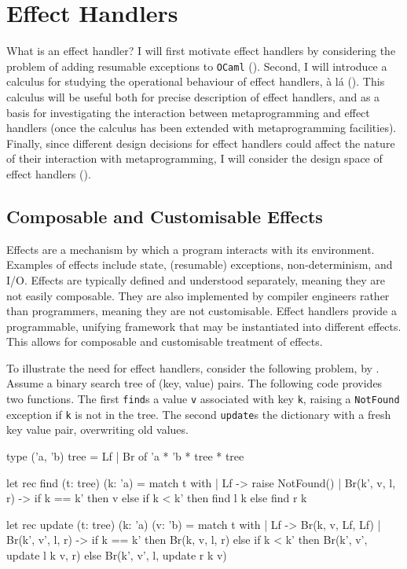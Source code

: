 \section{Effect Handlers}\label{section:effects-technical}
What is an effect handler? I will first motivate effect handlers by considering the problem of adding resumable exceptions to \texttt{OCaml} (). Second, I will introduce a calculus for studying the operational behaviour of effect handlers, à lá \citet{pretnar-15} (). This calculus will be useful both for precise description of effect handlers, and as a basis for investigating the interaction between metaprogramming and effect handlers (once the calculus has been extended with metaprogramming facilities). Finally, since different design decisions for effect handlers could affect the nature of their interaction with metaprogramming, I will consider the design space of effect handlers ().

\subsection{Composable and Customisable Effects}\label{subsection:effect-handler-motivation}
Effects are a mechanism by which a program interacts with its environment. Examples of effects include state, (resumable) exceptions, non-determinism, and I/O. Effects are typically defined and understood separately, meaning they are not easily composable. They are also implemented by compiler engineers rather than programmers, meaning they are not customisable. Effect handlers provide a programmable, unifying framework that may be instantiated into different effects. This allows for composable and customisable treatment of effects.

To illustrate the need for effect handlers, consider the following problem, by \citet{kiselyov-2012}. Assume a binary search tree of (key, value) pairs. The following code provides two functions. The first \texttt{find}s a value \texttt{v} associated with key \texttt{k}, raising a \texttt{NotFound} exception if \texttt{k} is not in the tree. The second \texttt{update}s the dictionary with a fresh key value pair, overwriting old values.

\begin{ocaml}
type ('a, 'b) tree = Lf | Br of 'a * 'b * tree * tree 

let rec find (t: tree) (k: 'a) = match t with 
 | Lf -> raise NotFound()
 | Br(k', v, l, r) -> if k == k' then v 
                      else if k < k' then find l k
                           else find r k

let rec update (t: tree) (k: 'a) (v: 'b) = match t with 
  | Lf -> Br(k, v, Lf, Lf)
  | Br(k', v', l, r) -> if k == k' then Br(k, v, l, r)
                        else if k < k' then Br(k', v', update l k v, r)
                        else Br(k', v', l, update r k v)
\end{ocaml}

